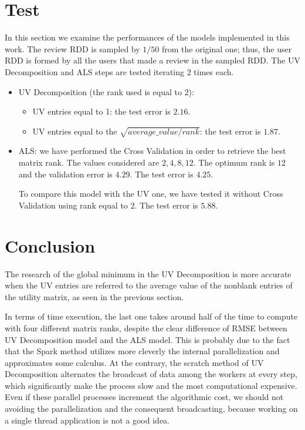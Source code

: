 \documentclass{article}
\begin{document}
\section{Test}
In this section we examine the performances of the models implemented in this work. The review RDD is sampled by $1/50$ from the original one; thus, the user RDD is formed by all the users that made a review in the sampled RDD. The UV Decomposition and ALS steps are tested iterating $2$ times each.  
\begin{itemize}
    \item UV Decomposition (the rank used is equal to $2$): 
    \begin{itemize}
        \item UV entries equal to 1: the test error is $2.16$.
        \item UV entries equal to the $\sqrt{average\_value/rank}$: the test error is $1.87$.
    \end{itemize}
    
    \item ALS: we have performed the Cross Validation in order to retrieve the best matrix rank. The values considered are $2, 4, 8, 12$. The optimum rank is $12$ and the validation error is $4.29$. The test error is $4.25$.
    
    To compare this model with the UV one, we have tested it without Cross Validation using rank equal to $2$. The test error is $5.88$.
\end{itemize}

\section{Conclusion}
The research of the global minimum in the UV Decomposition is more accurate when the UV entries are referred to the average value of the nonblank entries of the utility matrix, as seen in the previous section. 

In terms of time execution, the last one takes around half of the time to compute with four different matrix ranks, despite the clear difference of RMSE between UV Decomposition model and the ALS model. This is probably due to the fact that the Spark method utilizes more cleverly the internal parallelization and approximates some calculus. At the contrary, the scratch method of UV Decomposition alternates the broadcast of data among the workers at every step, which significantly make the process slow and the most computational expensive.
Even if these parallel processes increment the algorithmic cost, we should not avoiding the parallelization and the consequent broadcasting, because working on a single thread application is not a good idea. 
\end{document}
